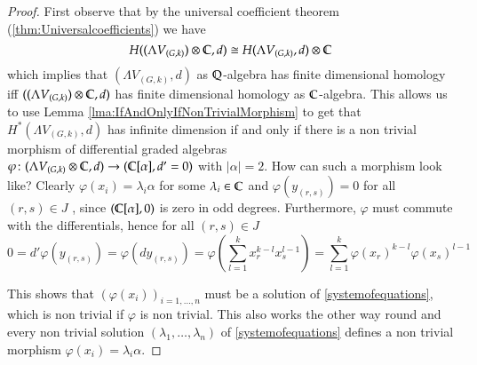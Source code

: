 \begin{proof}
 First observe that by the universal coefficient theorem (\ref{thm:Universalcoefficients}) we have
 $$ H ((\Lambda V_{(G,k)}) \otimes \mathbb{C}, d) \cong H(\Lambda V_{(G,k)}, d) \otimes \mathbb{C} $$ 
 which implies that $(\Lambda V_{(G,k)}, d)$ as  $\mathbb{Q}$-algebra has finite dimensional homology iff \newline
 ${((\Lambda V_{(G,k)}) \otimes \mathbb{C} , d)}$ has finite dimensional homology as $\mathbb{C}$-algebra. This allows
 us to use
 Lemma \ref{lma:IfAndOnlyIfNonTrivialMorphism} to get that $H^*(\Lambda V_{(G,k)},d)$  has infinite dimension if and only if 
 there is a non trivial morphism of differential graded algebras \\
 ${\varphi \colon (\Lambda V_{(G,k)} \otimes \mathbb{C},d)  \to ( \mathbb{C} [\alpha] ,d' = 0)}$ with $|\alpha| = 2$. How can such a morphism look like?
 Clearly $\varphi(x_i) = \lambda_i \alpha$ for some $\lambda_i \in \mathbb{C}$ and $\varphi(y_{(r,s)}) = 0$ for all $(r,s) \in J$ , since 
 $(\mathbb{C} [\alpha] , 0)$ is zero in odd degrees. Furthermore, $\varphi$ must commute with the differentials, hence 
 for all $(r,s) \in J$
 $$ 0 = d' \varphi(y_{(r,s)}) = \varphi(dy_{(r,s)}) = \varphi(\sum_{l = 1}^k x_r^{k -l} x_s^{l - 1})
 = \sum_{l = 1}^k \varphi(x_r)^{k -l} \varphi(x_s)^{l - 1}$$
 
 This shows that $(\varphi(x_i))_{i = 1, \dotsc , n}$ must be a solution of \ref{systemofequations}, which is non trivial
 if $\varphi$ is non trivial.
 This also works the other way round and every non trivial solution  $(\lambda_1 , \dotsc, \lambda_n)$ of \ref{systemofequations}
 defines a non trivial morphism $\varphi(x_i) = \lambda_i \alpha$.
 \end{proof}

